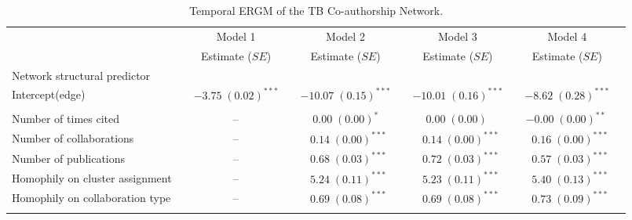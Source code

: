 
\begin{table}
\begin{center}
\caption{Temporal ERGM of the TB Co-authorship Network.}
\label{tab:tb_tergm}
\hspace*{-1cm}
\scriptsize
\begin{tabular}{@{}lcclclclcl@{}}
        \toprule
           &  & Model 1 &  & Model 2  &  & Model 3&  & Model 4\\ \cmidrule{3-3} \cmidrule{5-5} \cmidrule{7-7} \cmidrule{9-9}
           &  & Estimate ($SE$) &  & Estimate ($SE$)  &  & Estimate ($SE$) &  & Estimate ($SE$)\\
\midrule
Network structural predictor & & & & & & & & \\
\hspace{10pt}Intercept(edge)    &  & $-3.75 \; (0.02)^{***}$ & & $-10.07 \; (0.15)^{***}$ & & $-10.01 \; (0.16)^{***}$ & & $-8.62 \; (0.28)^{***}$ \\\\
Number of times cited       &  &       --    &  & $\hspace{6pt}0.00 \; (0.00)^{*~~~}$   &  & $\hspace{6pt}0.00 \; (0.00)^{~~~~}$      &  & $-0.00 \; (0.00)^{**~}$  \\
Number of collaborations    &  &         --  &  & $\hspace{6pt}0.14 \; (0.00)^{***}$ &  & $\hspace{6pt}0.14 \; (0.00)^{***}$ &  & $\hspace{6pt}0.16 \; (0.00)^{***}$  \\
Number of publications      &  &      --     &  & $\hspace{6pt}0.68 \; (0.03)^{***}$ &  & $\hspace{6pt}0.72 \; (0.03)^{***}$ &  & $\hspace{6pt}0.57 \; (0.03)^{***}$  \\
Homophily on cluster assignment   &  & --     &  & $\hspace{6pt}5.24 \; (0.11)^{***}$ &  & $\hspace{6pt}5.23 \; (0.11)^{***}$ &  & $\hspace{6pt}5.40 \; (0.13)^{***}$  \\
Homophily on collaboration type   &  &   --   &  & $\hspace{6pt}0.69 \; (0.08)^{***}$ &  & $\hspace{6pt}0.69 \; (0.08)^{***}$ &  & $\hspace{6pt}0.73 \; (0.09)^{***}$  \\\\

\end{tabular}
\end{center}
\end{table}
